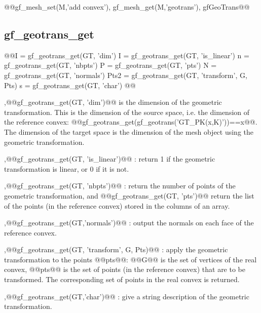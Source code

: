 \begin{gfseealso}
@@gf\_mesh\_set(M,'add convex'), gf_mesh_get(M,'geotrans'), gfGeoTrans@@
\end{gfseealso}
\newpage

\subsection{gf\_geotrans_get}
\begin{synopsis}
@@\tint I = gf_geotrans_get(\tgeotrans GT, 'dim')
\tint I = gf_geotrans_get(\tgeotrans GT, 'is_linear')
\tint n = gf_geotrans_get(\tgeotrans GT, 'nbpts')
\tmat P = gf_geotrans_get(\tgeotrans GT, 'pts')
\tmat N = gf_geotrans_get(\tgeotrans GT, 'normals')
\tmat Pts2 = gf_geotrans_get(\tgeotrans GT, 'transform', G, Pts)
\tstr s = gf_geotrans_get(\tgeotrans GT, 'char')
@@\end{synopsis}
\begin{cmddescription}
  \sep{@@gf_geotrans_get(GT, 'dim')@@} is the dimension of the
  geometric transformation. This is the dimension of the source space,
  i.e. the dimension of the reference convex:
  @@gf_geotrans_get(gf_geotrans('GT_PK(x,K)'))==x@@. The dimension of
  the target space is the dimension of the mesh object using the
  geometric transformation.

  \sep{@@gf_geotrans_get(GT, 'is_linear')@@} : return 1 if the geometric
  transformation is linear, or
  0 if it is not.
  
  \sep{@@gf_geotrans_get(GT, 'nbpts')@@} : return the number of points of the
  geometric transformation, and @@gf_geotrans_get(GT, 'pts')@@ return
  the list of the points (in the reference convex) stored in the
  columns of an array.
  
  \sep{@@gf_geotrans_get(GT,'normals')@@} : output the normals on each face
  of the reference convex.
  
  \sep{@@gf_geotrans_get(GT, 'transform', G, Pts)@@} : apply the
  geometric transformation to the points @@pts@@: @@G@@ is the set of
  vertices of the real convex, @@pts@@ is the set of points (in the
  reference convex) that are to be transformed. The corresponding set
  of points in the real convex is returned.

  \sep{@@gf_geotrans_get(GT,'char')@@} : give a string description of
  the geometric transformation.
\end{cmddescription}
